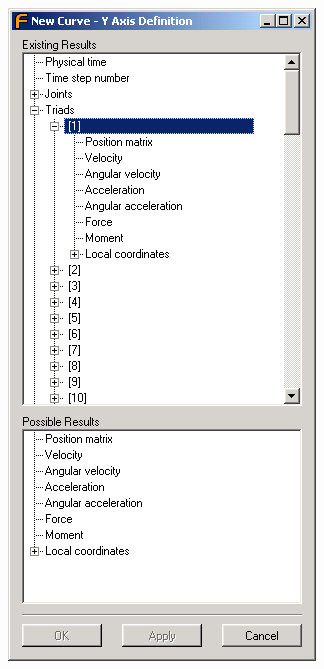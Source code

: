 \hfill\begin{minipage}{0.35\textwidth}
  \includegraphics[width=\textwidth]{Figures/Dialogs/7-RDB-Selector}
\end{minipage}

